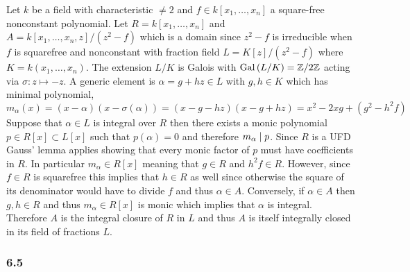 \documentclass[12pt]{article}
\begin{document}
Let $k$ be a field with characteristic $\neq 2$ and $f \in k[x_1, \dots, x_n]$ a square-free nonconstant polynomial. Let $R = k[x_1, \dots, x_n]$ and $A = k[x_1, \dots, x_n, z]/(z^2 - f)$ which is a domain since $z^2 - f$ is irreducible when $f$ is squarefree and nonconstant with fraction field $L = K[z]/(z^2 - f)$ where $K = k(x_1, \dots, x_n)$. The extension $L / K$ is Galois with $\mathrm{Gal}\left( L/K \right) = \mathbb{Z} / 2 \mathbb{Z}$ acting via $\sigma : z \mapsto -z$. A generic element is $\alpha = g + h z \in L$ with $g,h \in K$ which has minimal polynomial,
\[ m_\alpha(x) = (x - \alpha)(x - \sigma(\alpha)) = (x - g - h z)(x - g + hz) = x^2 - 2 xg + (g^2 - h^2 f) \]
Suppose that $\alpha \in L$ is integral over $R$ then there exists a monic polynomial $p \in R[x] \subset L[x]$ such that $p(\alpha) = 0$ and therefore $m_\alpha \mid p$. Since $R$ is a UFD Gauss' lemma applies showing that every monic factor of $p$ must have coefficients in $R$. In particular $m_\alpha \in R[x]$ meaning that $g \in R$ and $h^2 f \in R$. However, since $f \in R$ is squarefree this implies that $h \in R$ as well since otherwise the square of its denominator would have to divide $f$ and thus $\alpha \in A$. Conversely, if $\alpha \in A$ then $g,h \in R$ and thus $m_\alpha \in R[x]$ is monic which implies that $\alpha$ is integral. Therefore $A$ is the integral closure of $R$ in $L$ and thus $A$ is itself integrally closed in its field of fractions $L$.

\subsubsection{6.5}
\end{document}
